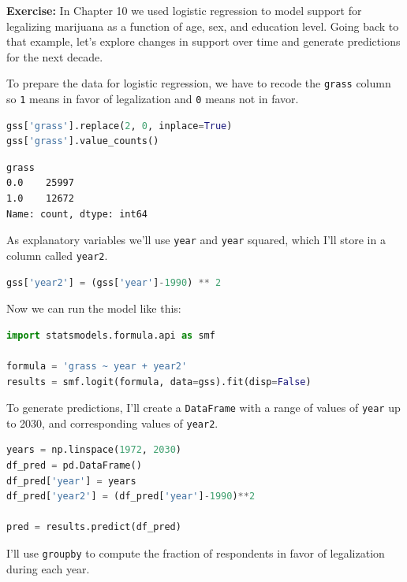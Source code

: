 \textbf{Exercise:} In Chapter 10 we used logistic regression to model
support for legalizing marijuana as a function of age, sex, and
education level. Going back to that example, let's explore changes in
support over time and generate predictions for the next decade.

To prepare the data for logistic regression, we have to recode the
\passthrough{\lstinline!grass!} column so \passthrough{\lstinline!1!}
means in favor of legalization and \passthrough{\lstinline!0!} means not
in favor.

\begin{lstlisting}[language=Python,style=source]
gss['grass'].replace(2, 0, inplace=True)
gss['grass'].value_counts()
\end{lstlisting}

\begin{lstlisting}[style=output]
grass
0.0    25997
1.0    12672
Name: count, dtype: int64
\end{lstlisting}

As explanatory variables we'll use \passthrough{\lstinline!year!} and
\passthrough{\lstinline!year!} squared, which I'll store in a column
called \passthrough{\lstinline!year2!}.

\begin{lstlisting}[language=Python,style=source]
gss['year2'] = (gss['year']-1990) ** 2
\end{lstlisting}

Now we can run the model like this:

\begin{lstlisting}[language=Python,style=source]
import statsmodels.formula.api as smf

formula = 'grass ~ year + year2'
results = smf.logit(formula, data=gss).fit(disp=False)
\end{lstlisting}

To generate predictions, I'll create a
\passthrough{\lstinline!DataFrame!} with a range of values of
\passthrough{\lstinline!year!} up to 2030, and corresponding values of
\passthrough{\lstinline!year2!}.

\begin{lstlisting}[language=Python,style=source]
years = np.linspace(1972, 2030)
df_pred = pd.DataFrame()
df_pred['year'] = years
df_pred['year2'] = (df_pred['year']-1990)**2

pred = results.predict(df_pred)
\end{lstlisting}

I'll use \passthrough{\lstinline!groupby!} to compute the fraction of
respondents in favor of legalization during each year.

